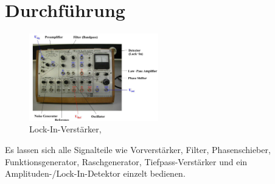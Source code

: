 \newpage
\section{Durchführung}
\label{sec:Durchfuehrung}
\begin{figure}
    \centering
    \includegraphics[width=0.5\textwidth]{bilder/aufbau.jpg}
    \caption{Lock-In-Verstärker,\cite[3]{Anleitung}}        
    \label{fig:aufbau}
\end{figure}


Es lassen sich alle Signalteile wie Vorverstärker, Filter, Phasenschieber, Funktionsgenerator, Raschgenerator,
Tiefpass-Verstärker und ein Amplituden-/Lock-In-Detektor einzelt bedienen.

